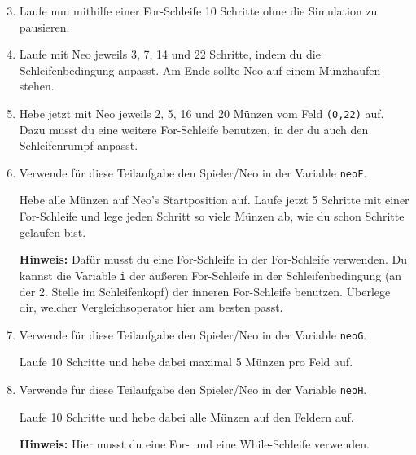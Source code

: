 \begin{enumerate}\setcounter{enumi}{2}
	\item
	Laufe nun mithilfe einer For-Schleife 10 Schritte ohne die Simulation zu pausieren.

	\item
	Laufe mit Neo jeweils 3, 7, 14 und 22 Schritte, indem du die Schleifenbedingung anpasst.
	Am Ende sollte Neo auf einem Münzhaufen stehen.
	
	\item
	Hebe jetzt mit Neo jeweils 2, 5, 16 und 20 Münzen vom Feld \texttt{(0,22)} auf.
	Dazu musst du eine weitere For-Schleife benutzen, in der du auch den Schleifenrumpf anpasst.
	
	\item
	Verwende für diese Teilaufgabe den Spieler/Neo in der Variable \lstinline{neoF}.
	
	Hebe alle Münzen auf Neo's Startposition auf.
	Laufe jetzt 5 Schritte mit einer For-Schleife und lege jeden Schritt so viele Münzen ab, wie du schon Schritte gelaufen bist.
	
	\textbf{Hinweis:} Dafür musst du eine For-Schleife in der For-Schleife verwenden.
	Du kannst die Variable \lstinline{i} der äußeren For-Schleife in der Schleifenbedingung (an der 2. Stelle im Schleifenkopf) der inneren For-Schleife benutzen.
	Überlege dir, welcher Vergleichsoperator hier am besten passt.
	
	\item
	Verwende für diese Teilaufgabe den Spieler/Neo in der Variable \lstinline{neoG}.
	
	Laufe 10 Schritte und hebe dabei maximal 5 Münzen pro Feld auf.
	
	\item
	Verwende für diese Teilaufgabe den Spieler/Neo in der Variable \lstinline{neoH}.
	
	Laufe 10 Schritte und hebe dabei alle Münzen auf den Feldern auf.
	
	\textbf{Hinweis:} Hier musst du eine For- und eine While-Schleife verwenden.
\end{enumerate}
\newpage
